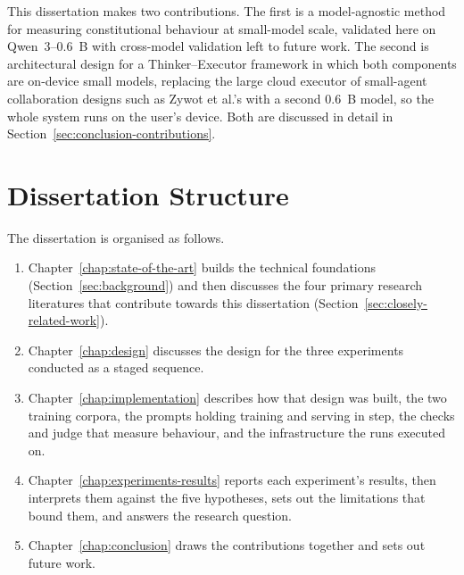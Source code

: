 This dissertation makes two contributions. The first is a model-agnostic method for measuring constitutional behaviour at small-model scale, validated here on Qwen~3--0.6~B with cross-model validation left to future work. The second is architectural design for a Thinker--Executor framework in which both components are on-device small models, replacing the large cloud executor of small-agent collaboration designs such as Zywot et al.'s \cite{zywot2026smallagentscollaboratebeat} with a second 0.6~B model, so the whole system runs on the user's device. Both are discussed in detail in Section~\ref{sec:conclusion-contributions}. 

\section{Dissertation Structure}
\label{sec:dissertation-structure}

The dissertation is organised as follows.

\begin{enumerate}
    \item Chapter~\ref{chap:state-of-the-art} builds the technical foundations (Section~\ref{sec:background}) and then discusses the four primary research literatures that contribute towards this dissertation (Section~\ref{sec:closely-related-work}).
    \item Chapter~\ref{chap:design} discusses the design for the three experiments conducted as a staged sequence.
    \item Chapter~\ref{chap:implementation} describes how that design was built, the two training corpora, the prompts holding training and serving in step, the checks and judge that measure behaviour, and the infrastructure the runs executed on.
    \item Chapter~\ref{chap:experiments-results} reports each experiment's results, then interprets them against the five hypotheses, sets out the limitations that bound them, and answers the research question.
    \item Chapter~\ref{chap:conclusion} draws the contributions together and sets out future work.
\end{enumerate}
